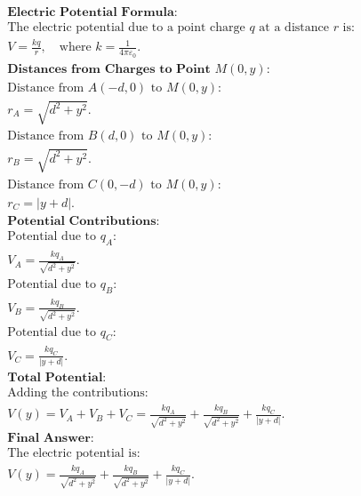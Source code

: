 \documentclass[12pt]{article}
\begin{document}
\begin{correctionbox}
	\begin{align*}
		 & \textbf{Electric Potential Formula:}                                                                              \\
		 & \text{The electric potential due to a point charge } q \text{ at a distance } r \text{ is:}                       \\
		 & V = \frac{k q}{r}, \quad \text{where } k = \frac{1}{4 \pi \varepsilon_0}.
		\\
		 & \textbf{Distances from Charges to Point } M(0, y):                                                                \\
		 & \text{Distance from } A(-d, 0) \text{ to } M(0, y):                                                               \\
		 & r_A = \sqrt{d^2 + y^2}.
		\\
		 & \text{Distance from } B(d, 0) \text{ to } M(0, y):                                                                \\
		 & r_B = \sqrt{d^2 + y^2}.
		\\
		 & \text{Distance from } C(0, -d) \text{ to } M(0, y):                                                               \\
		 & r_C = |y + d|.
		\\
		 & \textbf{Potential Contributions:}                                                                                 \\
		 & \text{Potential due to } q_A:                                                                                     \\
		 & V_A = \frac{k q_A}{\sqrt{d^2 + y^2}}.
		\\
		 & \text{Potential due to } q_B:                                                                                     \\
		 & V_B = \frac{k q_B}{\sqrt{d^2 + y^2}}.
		\\
		 & \text{Potential due to } q_C:                                                                                     \\
		 & V_C = \frac{k q_C}{|y + d|}.
		\\
		 & \textbf{Total Potential:}                                                                                         \\
		 & \text{Adding the contributions:}                                                                                  \\
		 & V(y) = V_A + V_B + V_C = \frac{k q_A}{\sqrt{d^2 + y^2}} + \frac{k q_B}{\sqrt{d^2 + y^2}} + \frac{k q_C}{|y + d|}.
		\\
		 & \textbf{Final Answer:}                                                                                            \\
		 & \text{The electric potential is:}                                                                                 \\
		 & V(y) = \frac{k q_A}{\sqrt{d^2 + y^2}} + \frac{k q_B}{\sqrt{d^2 + y^2}} + \frac{k q_C}{|y + d|}.
	\end{align*}
\end{correctionbox}
\end{document}
